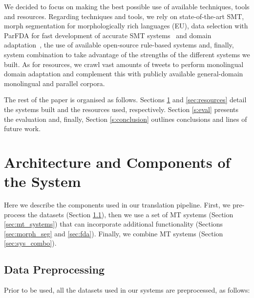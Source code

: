 \documentclass[postprint]{flammie}
\begin{document}
We decided to focus on making the best possible use of available techniques, tools and resources.
Regarding techniques and tools, we rely on state-of-the-art SMT, morph segmentation for morphologically rich languages (EU), data selection with ParFDA for fast development of accurate SMT systems~\cite{Bicici:FDA54FDA:WMT15} and domain adaptation~\cite{BiciciPBML2015}, the use of available open-source rule-based systems and, finally, system combination to take advantage of the strengths of the different systems we built.
As for resources, we crawl vast amounts of tweets to perform monolingual domain adaptation and complement this with publicly available general-domain monolingual and parallel corpora.

The rest of the paper is organised as follows.
Sections \ref{s:architecture} and \ref{sec:resources} detail the systems built and the resources used, respectively.
Section \ref{s:eval} presents the evaluation and, finally, Section \ref{s:conclusion} outlines conclusions and lines of future work.


\section{Architecture and Components of the System}\label{s:architecture}

Here we describe the components used in our translation pipeline.
First, we pre-process the datasets (Section \ref{sec:data_preprocessing}), then we use a set of MT systems (Section \ref{sec:mt_systems}) that can incorporate additional functionality (Sections \ref{sec:morph_seg} and \ref{sec:fda}).
Finally, we combine MT systems (Section \ref{sec:sys_combo}).

\subsection{Data Preprocessing}\label{sec:data_preprocessing}

Prior to be used, all the datasets used in our systems are preprocessed, as follows:
\end{document}
